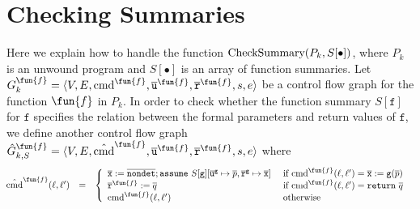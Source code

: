 
\section{Checking Summaries}\label{sec:checking-summary}

Here we explain how to handle the function $\textmd{CheckSummary} (P_k, S[\bullet])$, where $P_k$ is an unwound program and $S[\bullet]$ is an
array of function summaries.
Let $G^\fun{f}_k = \langle V, E, \textmd{cmd}^\fun{f}, \overline{\mathtt{u}}^\fun{f}, \overline{\mathtt{r}}^\fun{f},s,e \rangle$ be a
control flow graph for the function $\fun{f}$ in $P_k$. In order to check whether the function
summary $S[{\mathtt{f}}]$ for $\mathtt{f}$ specifies the relation 
between the formal parameters and return values of $\mathtt{f}$, 
we define another control flow graph
$\hat{G}^\fun{f}_{k,S} = \langle V, E, \hat{\textmd{cmd}}^\fun{f}, \overline{\mathtt{u}}^\fun{f}, \overline{\mathtt{r}}^\fun{f},s,e \rangle$ where
\begin{equation*}
\hspace{-0.2cm}
  \begin{array}{rcl}
    \hat{\textmd{cmd}}^\fun{f} (\ell, \ell') & = &
    \left\{
      \begin{array}{ll}
        \overline{\mathtt{x}} := 
        \overline{\mathtt{nondet}};
        \mathtt{assume\ }S[{\mathtt{g}}][
        \mathtt{\overline{u}^g} \mapsto \overline{p},
        \mathtt{\overline{r}^g} \mapsto \overline{\mathtt{x}}]    
        &
        \textmd{ if } \textmd{cmd}^\fun{f} (\ell, \ell') = 
        \overline{\mathtt{x}} := \mathtt{g} (\overline{p})\\
		\mathtt{\overline{r}}^\fun{f} := \overline{q}
        &
        \textmd{ if } \textmd{cmd}^\fun{f} (\ell, \ell') = \mathtt{return\ }
        \overline{q}\\
        \textmd{cmd}^\fun{f} (\ell, \ell')
        &
		\textmd{ otherwise}        
      \end{array}
    \right.
  \end{array}
\end{equation*}

